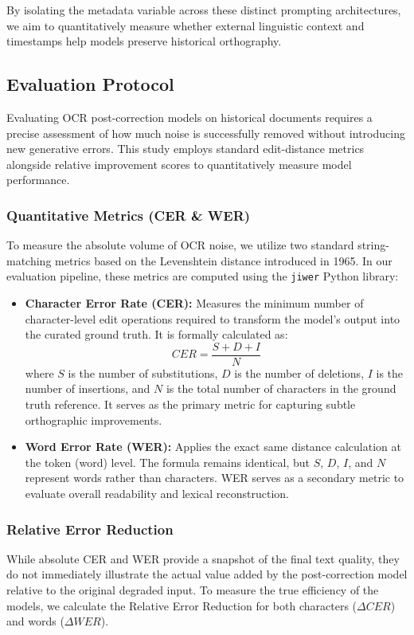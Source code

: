 \documentclass[11pt]{extarticle}
\begin{document}
By isolating the metadata variable across these distinct prompting architectures, we aim to quantitatively measure whether external linguistic context and timestamps help models preserve historical orthography.

\subsection{Evaluation Protocol}
Evaluating OCR post-correction models on historical documents requires a precise assessment of how much noise is successfully removed without introducing new generative errors. This study employs standard edit-distance metrics alongside relative improvement scores to quantitatively measure model performance.

\subsubsection{Quantitative Metrics (CER \& WER)}
To measure the absolute volume of OCR noise, we utilize two standard string-matching metrics based on the Levenshtein distance introduced in 1965. In our evaluation pipeline, these metrics are computed using the \texttt{jiwer} Python library:
\begin{itemize}
    \item \textbf{Character Error Rate (CER):} Measures the minimum number of character-level edit operations required to transform the model's output into the curated ground truth. It is formally calculated as:
    \begin{equation}
        CER = \frac{S + D + I}{N}
    \end{equation}
    where $S$ is the number of substitutions, $D$ is the number of deletions, $I$ is the number of insertions, and $N$ is the total number of characters in the ground truth reference. It serves as the primary metric for capturing subtle orthographic improvements.
    
    \item \textbf{Word Error Rate (WER):} Applies the exact same distance calculation at the token (word) level. The formula remains identical, but $S$, $D$, $I$, and $N$ represent words rather than characters. WER serves as a secondary metric to evaluate overall readability and lexical reconstruction.
\end{itemize}

\subsubsection{Relative Error Reduction}
While absolute CER and WER provide a snapshot of the final text quality, they do not immediately illustrate the actual value added by the post-correction model relative to the original degraded input. To measure the true efficiency of the models, we calculate the Relative Error Reduction for both characters ($\Delta CER$) and words ($\Delta WER$).
\end{document}
